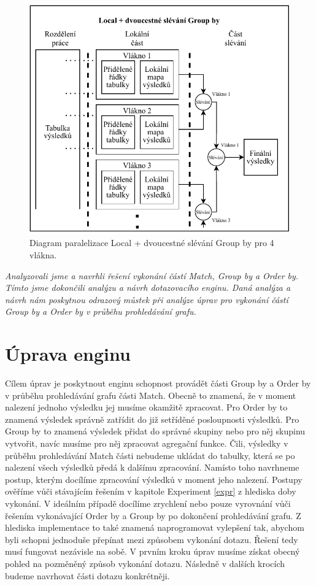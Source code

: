 \clearpage

\begin{figure}[!htp]
\includegraphics{../img/diaLocalGr.pdf}\centering
\caption{Diagram paralelizace Local + dvoucestné slévání Group by pro 4 vlákna.}
\label{figure.diaLocalGr}
\end{figure}

\bigskip
\textit{Analyzovali jsme a navrhli řešení vykonání částí Match, Group by a Order by.
Tímto jsme dokončili analýzu a návrh dotazovacího enginu.
Daná analýza a návrh nám poskytnou odrazový můstek při analýze úprav pro vykonání částí Group by a Order by v průběhu prohledávání grafu.
}

\section{Úprava enginu} \label{anal.improvement}

Cílem úprav je poskytnout enginu schopnost provádět části Group by a Order by v průběhu prohledávání grafu části Match.
Obecně to znamená, že v moment nalezení jednoho výsledku jej musíme okamžitě zpracovat.
Pro Order by to znamená výsledek správně zatřídit do již setříděné posloupnosti výsledků.
Pro Group by to znamená výsledek přidat do správné skupiny nebo pro něj skupinu vytvořit, navíc musíme pro něj zpracovat agregační funkce. 
Čili, výsledky v průběhu prohledávání Match části nebudeme ukládat do tabulky, která se po nalezení všech výsledků předá k dalšímu zpracování.
Namísto toho navrhneme postup, kterým docílíme zpracování výsledků v moment jeho nalezení.
Postupy ověříme vůči stávajícím řešením v kapitole Experiment \ref{expr} z hlediska doby vykonání.
V ideálním případě docílíme zrychlení nebo pouze vyrovnání vůči řešením vykonávající Order by a Group by po dokončení prohledávání grafu.
Z hlediska implementace to také znamená naprogramovat vylepšení tak, abychom byli schopni jednoduše přepínat mezi způsobem vykonání dotazu.
Řešení tedy musí fungovat nezávisle na sobě. 
V prvním kroku úprav musíme získat obecný pohled na pozměněný způsob vykonání dotazu.
Následně v dalších krocích budeme navrhovat části dotazu konkrétněji.

